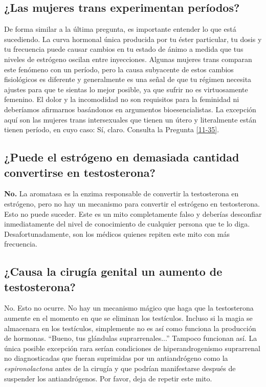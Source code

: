 \documentclass{article}
\begin{document}
\subsection{¿Las mujeres trans experimentan períodos?}

De forma similar a la última pregunta, es importante entender lo que está sucediendo. La curva hormonal única producida por tu éster particular, tu dosis y tu frecuencia puede causar cambios en tu estado de ánimo a medida que tus niveles de estrógeno oscilan entre inyecciones. Algunas mujeres trans comparan este fenómeno con un período, pero la causa subyacente de estos cambios fisiológicos es diferente y generalmente es una señal de que tu régimen necesita ajustes para que te sientas lo mejor posible, ya que sufrir no es virtuosamente femenino. El dolor y la incomodidad no son requisitos para la feminidad ni deberíamos afirmarnos basándonos en argumentos bioesencialistas. La excepción aquí son las mujeres trans intersexuales que tienen un útero y literalmente están tienen período, en cuyo caso: Sí, claro. Consulta la Pregunta \ref{11-35}.

\subsection{¿Puede el estrógeno en demasiada cantidad convertirse en testosterona?}

\textbf{No.} La aromatasa es la enzima responsable de convertir la testosterona en estrógeno, pero no hay un mecanismo para convertir el estrógeno en testosterona. Esto no puede suceder. Este es un mito completamente falso y deberías desconfiar inmediatamente del nivel de conocimiento de cualquier persona que te lo diga. Desafortunadamente, son los médicos quienes repiten este mito con más frecuencia.

\subsection{¿Causa la cirugía genital un aumento de testosterona?}

No. Esto no ocurre. No hay un mecanismo mágico que haga que la testosterona aumente en el momento en que se eliminan los testículos. Incluso si la magia se almacenara en los testículos, simplemente no es así como funciona la producción de hormonas. “Bueno, tus glándulas suprarrenales...” Tampoco funcionan así. La única posible excepción rara serían condiciones de hiperandrogenismo suprarrenal no diagnosticadas que fueran suprimidas por un antiandrógeno como la \textit{espironolactona} antes de la cirugía y que podrían manifestarse después de suspender los antiandrógenos. Por favor, deja de repetir este mito.
\end{document}
